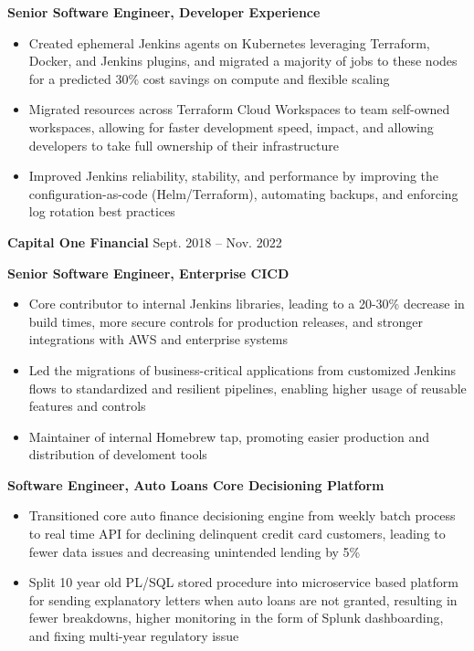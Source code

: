 \documentclass[11pt]{article}
\begin{document}
\textbf{Senior Software Engineer, Developer Experience}
\begin{itemize}
      \item Created ephemeral Jenkins agents on Kubernetes leveraging
            Terraform, Docker, and Jenkins plugins, and migrated a majority of jobs to these nodes
            for a predicted 30\% cost savings on compute and flexible scaling
      \item Migrated resources across Terraform Cloud Workspaces to team self-owned
            workspaces, allowing for faster development speed, impact, and allowing developers to take full ownership of their infrastructure
      \item Improved Jenkins reliability, stability, and performance by improving
            the configuration-as-code (Helm/Terraform), automating backups, and enforcing log rotation best practices
\end{itemize}

\vspace{0.1cm}

{\Large\textbf{Capital One Financial}} \hfill Sept. 2018 -- Nov. 2022

\textbf{Senior Software Engineer, Enterprise CICD}
\begin{itemize}
  \item Core contributor to internal Jenkins libraries, leading to a 20-30\% decrease in
        build times, more secure controls for production releases, and stronger
        integrations with AWS and enterprise systems
  \item Led the migrations of business-critical applications from customized Jenkins flows
        to standardized and resilient pipelines, enabling higher usage of reusable
        features and controls
  \item Maintainer of internal Homebrew tap, promoting easier production and distribution of develoment tools
\end{itemize}

\textbf{Software Engineer, Auto Loans Core Decisioning Platform}
\begin{itemize}
  \item Transitioned core auto finance decisioning engine from weekly batch
        process to real time API for declining delinquent credit card customers,
        leading to fewer data issues and decreasing unintended
        lending by 5\%
  \item Split 10 year old PL/SQL stored procedure into microservice based
        platform for sending explanatory letters when auto loans are not granted,
        resulting in fewer breakdowns, higher monitoring in the form of Splunk dashboarding,
        and fixing multi-year regulatory issue
\end{itemize}
\end{document}
